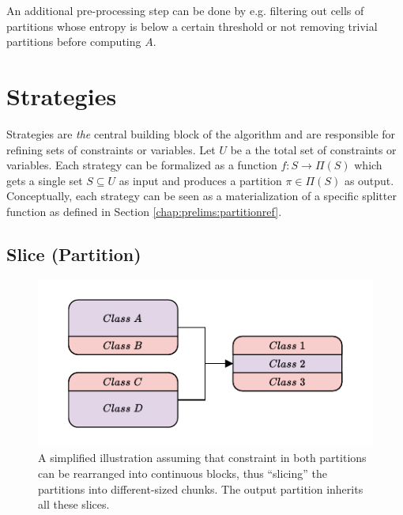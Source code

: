 				An additional pre-processing step can be done by e.g. filtering out cells of partitions whose entropy is below a certain threshold or not removing trivial partitions before computing $A$.

				\clearpage

%
%			

	\section{Strategies}
	\label{chap:tree:strategies}

		Strategies are \textit{the} central building block of the algorithm and are responsible for refining sets of constraints or variables.
		Let $U$ be a the total set of constraints or variables.
		Each strategy can be formalized as a function $f: S \rightarrow \Pi(S)$ which gets a single set $S \subseteq U$ as input and produces a partition $\pi \in \Pi(S)$ as output.
		Conceptually, each strategy can be seen as a materialization of a specific splitter function as defined in Section \ref{chap:prelims:partitionref}.


		\subsection{Slice (Partition)}
		\label{chap:tree:strategies:slice:part}

			\begin{figure}[ht!]
				\centering
				\includegraphics[scale=1.2]{Bilder/DrawIO/strat_slicing_pdf}
				\caption{A simplified illustration assuming that constraint in both partitions can be rearranged into continuous blocks, thus \enquote{slicing} the partitions into different-sized chunks. The output partition inherits all these slices.}
				\label{fig:tree:strat:slice}
			\end{figure}

